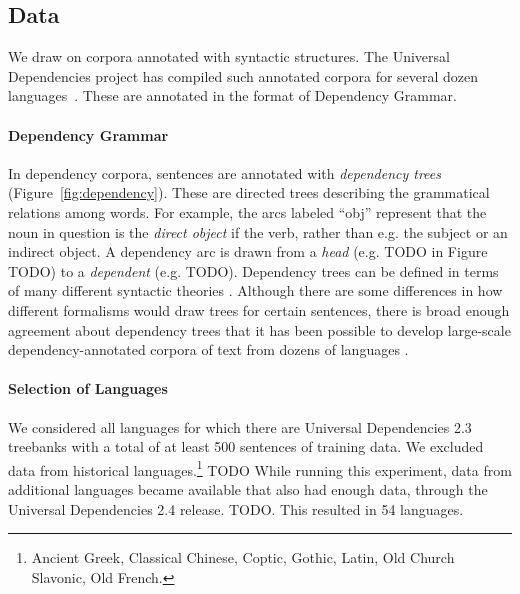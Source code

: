 \subsection{Data}
We draw on corpora annotated with syntactic structures.
The Universal Dependencies project has compiled such annotated corpora for several dozen languages~\citep{nivre-universal-2017}.
These are annotated in the format of Dependency Grammar.

\paragraph{Dependency Grammar}
In dependency corpora, sentences are annotated with \emph{dependency trees} (Figure~\ref{fig:dependency}).
These are directed trees describing the grammatical relations among words. For example, the arcs labeled ``obj'' represent that the noun in question is the \emph{direct object} if the verb, rather than e.g. the subject or an indirect object.
A dependency arc is drawn from a \emph{head} (e.g. TODO in Figure TODO) to a \emph{dependent} (e.g. TODO).
Dependency trees can be defined in terms of many different syntactic theories \citep{corbett1993heads}.
Although there are some differences in how different formalisms would draw trees for certain sentences, there is broad enough agreement about dependency trees that it has been possible to develop large-scale dependency-annotated corpora of text from dozens of languages \cite{nivre2017universal}.

\paragraph{Selection of Languages}
We considered all languages for which there are Universal Dependencies 2.3 treebanks with a total of at least 500 sentences of training data.
We excluded data from historical languages.\footnote{Ancient Greek, Classical Chinese, Coptic, Gothic, Latin, Old Church Slavonic, Old French.}
TODO While running this experiment, data from additional languages became available that also had enough data, through the Universal Dependencies 2.4 release. TODO.
This resulted in 54 languages.


